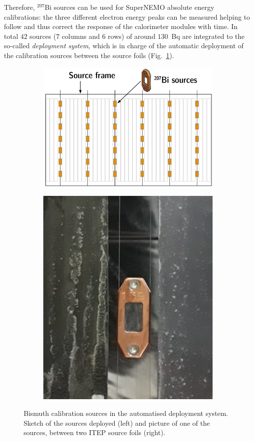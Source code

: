 Therefore, $^{207}$Bi sources can be used for SuperNEMO absolute energy calibrations: the three different electron energy peaks can be measured helping to follow and thus correct the response of the calorimeter modules with time.
In total $42$ sources ($7$ columns and $6$ rows) of around $130$~Bq are integrated to the so-called \emph{deployment system}, which is in charge of the automatic deployment of the calibration sources between the source foils (Fig.~\ref{fig:bi_sources}).
\begin{figure}[!h]
  \centering
  \begin{subfigure}[t]{0.49\textwidth}
    \centering
    \includegraphics[height=0.8\textwidth]{SNdemonstrator/fig_SNdemonstrator/bi_sources_position.pdf}
  \end{subfigure}
  \hfill
  \begin{subfigure}[t]{0.49\textwidth}
    \centering
    \includegraphics[height=0.8\textwidth]{SNdemonstrator/fig_SNdemonstrator/bi_source_pic.pdf}
  \end{subfigure}
  \caption{Bismuth calibration sources in the automatised deployment system.
    Sketch of the sources deployed (left) and picture of one of the sources, between two ITEP source foils (right).
    \label{fig:bi_sources}}
\end{figure}
